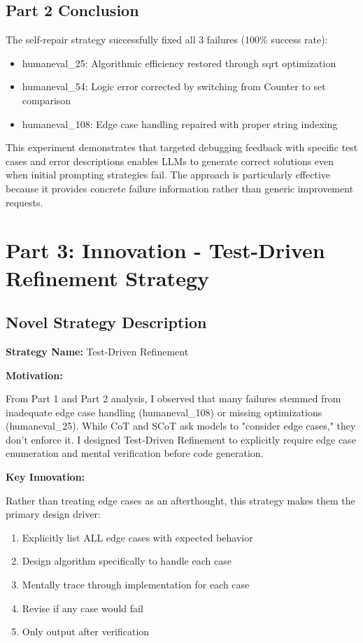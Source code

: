 \documentclass[11pt]{article}
\begin{document}
\subsection{Part 2 Conclusion}

The self-repair strategy successfully fixed all 3 failures (100\% success rate):
\begin{itemize}
    \item humaneval\_25: Algorithmic efficiency restored through sqrt optimization
    \item humaneval\_54: Logic error corrected by switching from Counter to set comparison
    \item humaneval\_108: Edge case handling repaired with proper string indexing
\end{itemize}

This experiment demonstrates that targeted debugging feedback with specific test cases and error descriptions enables LLMs to generate correct solutions even when initial prompting strategies fail. The approach is particularly effective because it provides concrete failure information rather than generic improvement requests.

\newpage
\clearpage
\section{Part 3: Innovation - Test-Driven Refinement Strategy}

\subsection{Novel Strategy Description}

\textbf{Strategy Name:} Test-Driven Refinement

\textbf{Motivation:} 

From Part 1 and Part 2 analysis, I observed that many failures stemmed from inadequate edge case handling (humaneval\_108) or missing optimizations (humaneval\_25). While CoT and SCoT ask models to "consider edge cases," they don't enforce it. I designed Test-Driven Refinement to explicitly require edge case enumeration and mental verification before code generation.

\textbf{Key Innovation:}

Rather than treating edge cases as an afterthought, this strategy makes them the primary design driver:
\begin{enumerate}
    \item Explicitly list ALL edge cases with expected behavior
    \item Design algorithm specifically to handle each case
    \item Mentally trace through implementation for each case
    \item Revise if any case would fail
    \item Only output after verification
\end{enumerate}
\end{document}
